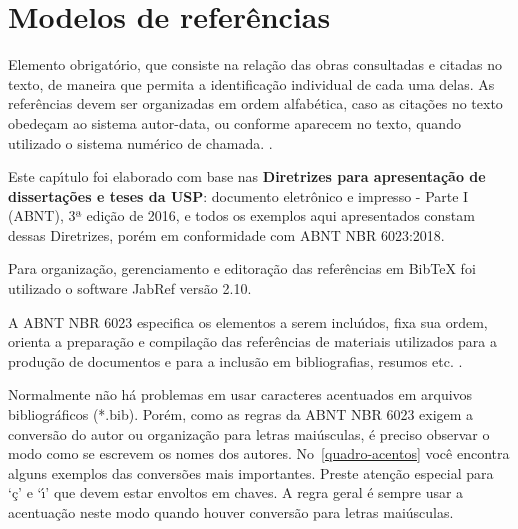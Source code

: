 

\chapter{Modelos de refer\^encias}
\label{Refer\^encias}
Elemento obrigat\'orio, que consiste na rela\c{c}\~ao das obras consultadas e citadas no texto, de maneira que permita a identifica\c{c}\~ao individual de cada uma delas. As refer\^encias devem ser organizadas em ordem alfab\'etica, caso as cita\c{c}\~oes no texto obede\c{c}am ao sistema autor-data, ou conforme aparecem no texto, quando utilizado o sistema num\'erico de chamada. \cite{sibi2016}.

Este cap\'{\i}tulo foi elaborado com base nas \textbf{Diretrizes para apresenta\c{c}\~ao de disserta\c{c}\~oes e teses da USP}: documento eletr\^onico e impresso - Parte I (ABNT), 3ª edi\c{c}\~ao de 2016, e todos os exemplos aqui apresentados constam dessas Diretrizes, por\'em em conformidade com ABNT NBR 6023:2018. 

Para organiza\c{c}\~ao, gerenciamento e editora\c{c}\~ao das refer\^encias em BibTeX foi utilizado o software JabRef vers\~ao 2.10.

A ABNT NBR 6023 especifica os elementos a serem inclu\'{\i}dos, fixa sua ordem, orienta a prepara\c{c}\~ao e compila\c{c}\~ao das refer\^encias de materiais utilizados para a produ\c{c}\~ao de documentos e para a inclus\~ao em bibliografias, resumos etc. \cite{nbr6023a}.

Normalmente n\~ao h\'a problemas em usar caracteres acentuados em arquivos bibliogr\'aficos {(*.bib)}. Por\'em, como as regras da ABNT NBR 6023 exigem a convers\~ao do autor ou organiza\c{c}\~ao para letras mai\'usculas, \'e preciso observar o modo como se escrevem os nomes dos autores. No~\autoref{quadro-acentos} voc\^e encontra alguns
exemplos das convers\~oes mais importantes. Preste aten\c{c}\~ao especial para `\c{c}' e `\'{\i}'
que devem estar envoltos em chaves. A regra geral \'e sempre usar a acentua\c{c}\~ao neste modo quando houver convers\~ao para letras mai\'usculas. \cite{abnetxcite} \\

